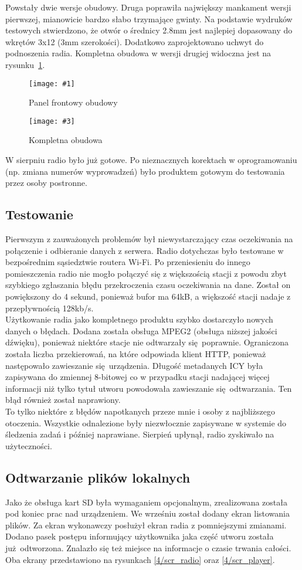 \documentclass[12pt]{report}
\newcommand{\imgintss}[5]{
	\begin{figure}[{#5}]
		\centering
		\begin{minipage}{.45\textwidth}
			\centering
			\texttt{[image: \#1]}
			\caption{#2}
			\label{#1}
		\end{minipage}%
		\hfill
		\begin{minipage}{.45\textwidth}
			\centering
			\texttt{[image: \#3]}
			\caption{#4}
			\label{#3}
		\end{minipage}
	\end{figure}
}
\newcommand{\imghss}[4]{\imgintss{#1}{#2}{#3}{#4}{H}}
\begin{document}
			Powstały dwie wersje obudowy. Druga poprawiła największy mankament wersji pierwszej, mianowicie bardzo słabo trzymające gwinty. Na podstawie wydruków testowych stwierdzono, że otwór o średnicy 2.8mm jest najlepiej dopasowany do wkrętów 3x12 (3mm szerokości). Dodatkowo zaprojektowano uchwyt do podnoszenia radia. Kompletna obudowa w wersji drugiej widoczna jest na rysunku~\ref{4/case2}.
			
			\imghss{4/case1}{Panel frontowy obudowy}{4/case2}{Kompletna obudowa}
			
			W sierpniu radio było już gotowe. Po nieznacznych korektach w oprogramowaniu (np. zmiana numerów wyprowadzeń) było produktem gotowym do testowania przez osoby postronne.

		\subsection{Testowanie}
			Pierwszym z zauważonych problemów był niewystarczający czas oczekiwania na połączenie i odbieranie danych z serwera. Radio dotychczas było testowane w bezpośrednim sąsiedztwie routera Wi-Fi. Po przeniesieniu do innego pomieszczenia radio nie mogło połączyć się z większością stacji z powodu zbyt szybkiego zgłaszania błędu przekroczenia czasu oczekiwania na dane. Został on powiększony do 4 sekund, ponieważ bufor ma 64kB, a większość stacji nadaje z przepływnością 128kb/s.
			$ $\\
			
			Użytkowanie radia jako kompletnego produktu szybko dostarczyło nowych danych o błędach. Dodana została obsługa MPEG2 (obsługa niższej jakości dźwięku), ponieważ niektóre stacje nie odtwarzały się poprawnie. Ograniczona została liczba przekierowań, na które odpowiada klient HTTP, ponieważ następowało zawieszanie się urządzenia. Długość metadanych ICY była zapisywana do zmiennej 8-bitowej co w przypadku stacji nadającej więcej informacji niż tylko tytuł utworu powodowała zawieszanie się odtwarzania. Ten błąd również został naprawiony.
			$ $\\
			
			To tylko niektóre z błędów napotkanych przeze mnie i osoby z najbliższego otoczenia. Wszystkie odnalezione były niezwłocznie zapisywane w systemie do śledzenia zadań i później naprawiane. Sierpień upłynął, radio zyskiwało na użyteczności.
			
		\subsection{Odtwarzanie plików lokalnych}
			Jako że obsługa kart SD była wymaganiem opcjonalnym, zrealizowana została pod koniec prac nad urządzeniem. We wrześniu został dodany ekran listowania plików. Za ekran wykonawczy posłużył ekran radia z pomniejszymi zmianami. Dodano pasek postępu informujący użytkownika jaka część utworu została już odtworzona. Znalazło się też miejsce na informacje o czasie trwania całości. Oba ekrany przedstawiono na rysunkach \ref{4/scr_radio} oraz \ref{4/scr_player}.
			
\end{document}
